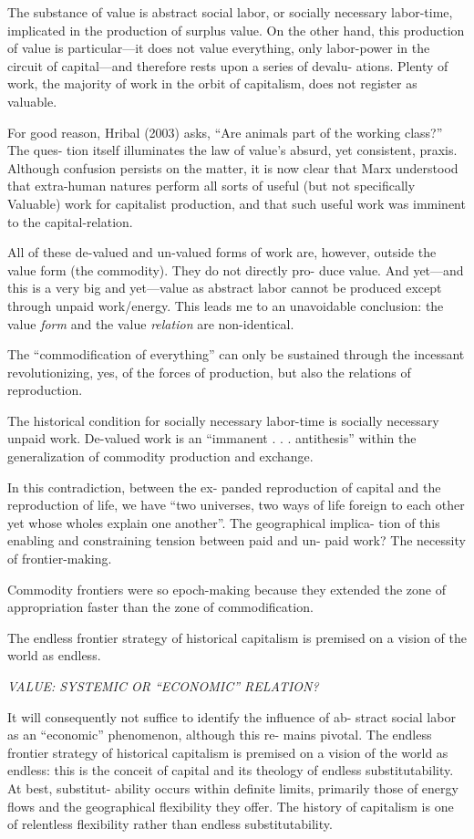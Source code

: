 \documentclass[
]{book}
\begin{document}
The substance of value is
abstract social labor, or socially necessary labor-time, implicated in
the production of surplus value. On the other hand, this production
of value is particular---it does not value everything, only labor-power
in the circuit of capital---and therefore rests upon a series of devalu-
ations. Plenty of work, the majority of work in the orbit of capitalism,
does not register as valuable.

For good reason,
Hribal (2003) asks, ``Are animals part of the working class?'' The ques-
tion itself illuminates the law of value's absurd, yet consistent, praxis.
Although confusion persists on the matter, it is now clear that Marx
understood that extra-human natures perform all sorts of useful (but
not specifically Valuable) work for capitalist production, and that such
useful work was imminent to the capital-relation.

All of these de-valued and un-valued forms of work are, however,
outside the value form (the commodity). They do not directly pro-
duce value. And yet---and this is a very big and yet---value as abstract
labor cannot be produced except through unpaid work/energy. This
leads me to an unavoidable conclusion: the value \emph{form} and the value
\emph{relation} are non-identical.

The ``commodification of everything'' can
only be sustained through the incessant revolutionizing, yes, of the
forces of production, but also the relations of reproduction.

The historical condition for socially necessary labor-time is
socially necessary unpaid work. De-valued work is an ``immanent . . .
antithesis'' within the generalization of commodity production and
exchange.

In this contradiction, between the ex-
panded reproduction of capital and the reproduction of life, we have
``two universes, two ways of life foreign to each other yet whose wholes
explain one another''.
The geographical implica-
tion of this enabling and constraining tension between paid and un-
paid work? The necessity of frontier-making.

Commodity frontiers were so epoch-making
because they extended the zone of appropriation faster than the zone
of commodification.

The endless frontier strategy of historical capitalism is
premised on a vision of the world as endless.

\emph{VALUE: SYSTEMIC OR ``ECONOMIC'' RELATION?}

It will consequently not suffice to identify the influence of ab-
stract social labor as an ``economic'' phenomenon, although this re-
mains pivotal. The endless frontier strategy of historical capitalism is
premised on a vision of the world as endless: this is the conceit of
capital and its theology of endless substitutability.
At best, substitut-
ability occurs within definite limits, primarily those of energy flows
and the geographical flexibility they offer. The history of capitalism is
one of relentless flexibility rather than endless substitutability.
\end{document}
